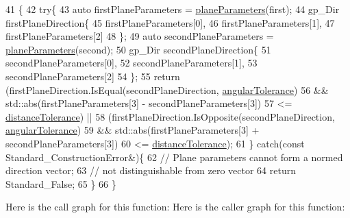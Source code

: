 \begin{DoxyCode}
41                                                                                     \{
42     \textcolor{keywordflow}{try}\{
43         \textcolor{keyword}{auto} firstPlaneParameters = \hyperlink{classMcCAD_1_1Tools_1_1PlaneComparator_a1b61d399885072e2af2e3cd03d1ca6c3}{planeParameters}(first);
44         gp\_Dir firstPlaneDirection\{
45             firstPlaneParameters[0],
46             firstPlaneParameters[1],
47             firstPlaneParameters[2]
48         \};
49         \textcolor{keyword}{auto} secondPlaneParameters = \hyperlink{classMcCAD_1_1Tools_1_1PlaneComparator_a1b61d399885072e2af2e3cd03d1ca6c3}{planeParameters}(second);
50         gp\_Dir secondPlaneDirection\{
51             secondPlaneParameters[0],
52             secondPlaneParameters[1],
53             secondPlaneParameters[2]
54         \};
55         \textcolor{keywordflow}{return} (firstPlaneDirection.IsEqual(secondPlaneDirection, 
      \hyperlink{classMcCAD_1_1Tools_1_1PlaneComparator_a7a12aa43a017dfa6242fc51d87310232}{angularTolerance})
56                 && std::abs(firstPlaneParameters[3] - secondPlaneParameters[3])
57                 <= \hyperlink{classMcCAD_1_1Tools_1_1PlaneComparator_a6e41cff0b95b5a5aa18de33ee9925e04}{distanceTolerance}) ||
58                (firstPlaneDirection.IsOpposite(secondPlaneDirection, 
      \hyperlink{classMcCAD_1_1Tools_1_1PlaneComparator_a7a12aa43a017dfa6242fc51d87310232}{angularTolerance})
59                 && std::abs(firstPlaneParameters[3] + secondPlaneParameters[3])
60                 <= \hyperlink{classMcCAD_1_1Tools_1_1PlaneComparator_a6e41cff0b95b5a5aa18de33ee9925e04}{distanceTolerance});
61     \} \textcolor{keywordflow}{catch}(\textcolor{keyword}{const} Standard\_ConstructionError&)\{
62         \textcolor{comment}{// Plane parameters cannot form a normed direction vector;}
63         \textcolor{comment}{// not distinguishable from zero vector}
64         \textcolor{keywordflow}{return} Standard\_False;
65       \}
66 \}
\end{DoxyCode}
Here is the call graph for this function\+:
Here is the caller graph for this function\+:
\mbox{\label{classMcCAD_1_1Tools_1_1PlaneComparator_a6b3939e79155c791bdc5da4dc7d3b980}} 
